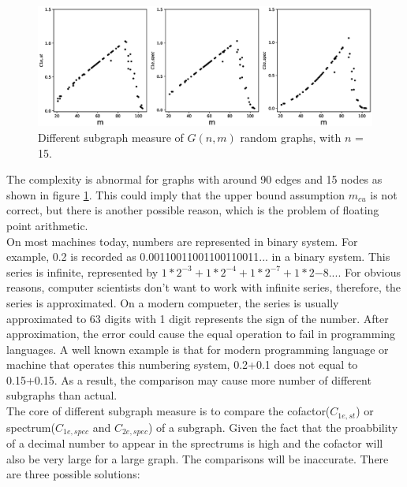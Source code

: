 \documentclass[12pt]{article}
\begin{document}
\begin{figure}[ht]
    \includegraphics[width=\textwidth]{subgraph_measures.eps}
    \caption{Different subgraph measure of $G(n,m)$ random graphs, with $n$ = 15.}
    \label{fig:subgraph_measure}
\end{figure}
\noindent
The complexity is abnormal for graphs with around 90 edges and 15 nodes as shown in figure \ref{fig:subgraph_measure}. This could imply that the upper bound assumption $m_{cu}$ is not correct, but there is another possible reason, which is the problem of floating point arithmetic.\\
On most machines today, numbers are represented in binary system\cite{floating_point}. For example, 0.2 is recorded as 0.00110011001100110011... in a binary system. This series is infinite, represented by $1*2^{-3}+1*2^{-4}+1*2^{-7}+1*2{-8}...$. For obvious reasons, computer scientists don't want to work with infinite series, therefore, the series is approximated. On a modern compueter, the series is usually approximated to 63 digits with 1 digit represents the sign of the number. After approximation, the error could cause the equal operation to fail in programming languages. A well known example is that for modern programming language or machine that operates this numbering system, 0.2+0.1 does not equal to 0.15+0.15. As a result, the comparison may cause more number of different subgraphs than actual.\\
The core of different subgraph measure is to compare the cofactor($C_{1e,st}$) or spectrum($C_{1e,spec}$ and $C_{2e,spec}$) of a subgraph. Given the fact that the proabbility of a decimal number to appear in the sprectrums is high and the cofactor will also be very large for a large graph. The comparisons will be inaccurate. There are three possible solutions:
\end{document}
